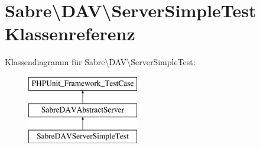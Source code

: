 \hypertarget{class_sabre_1_1_d_a_v_1_1_server_simple_test}{}\section{Sabre\textbackslash{}D\+AV\textbackslash{}Server\+Simple\+Test Klassenreferenz}
\label{class_sabre_1_1_d_a_v_1_1_server_simple_test}
Klassendiagramm für Sabre\textbackslash{}D\+AV\textbackslash{}Server\+Simple\+Test\+:\begin{figure}[H]
\begin{center}
\leavevmode
\includegraphics[height=3.000000cm]{class_sabre_1_1_d_a_v_1_1_server_simple_test}
\end{center}
\end{figure}
